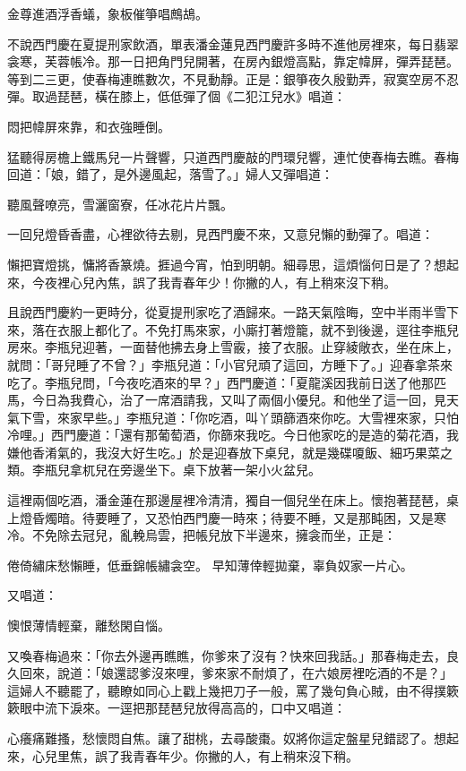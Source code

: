 金尊進酒浮香蟻，象板催箏唱鷓鴣。

不說西門慶在夏提刑家飲酒，單表潘金蓮見西門慶許多時不進他房裡來，每日翡翠衾寒，芙蓉帳冷。那一日把角門兒開著，在房內銀燈高點，靠定幃屏，彈弄琵琶。等到二三更，使春梅連瞧數次，不見動靜。正是：銀箏夜久殷勤弄，寂寞空房不忍彈。取過琵琶，橫在膝上，低低彈了個《二犯江兒水》唱道：

悶把幃屏來靠，和衣強睡倒。

猛聽得房檐上鐵馬兒一片聲響，只道西門慶敲的門環兒響，連忙使春梅去瞧。春梅回道：「娘，錯了，是外邊風起，落雪了。」婦人又彈唱道：

聽風聲嘹亮，雪灑窗寮，任冰花片片飄。

一回兒燈昏香盡，心裡欲待去剔，見西門慶不來，又意兒懶的動彈了。唱道：

懶把寶燈挑，慵將香篆燒。捱過今宵，怕到明朝。細尋思，這煩惱何日是了？想起來，今夜裡心兒內焦，誤了我青春年少！你撇的人，有上稍來沒下稍。

且說西門慶約一更時分，從夏提刑家吃了酒歸來。一路天氣陰晦，空中半雨半雪下來，落在衣服上都化了。不免打馬來家，小廝打著燈籠，就不到後邊，逕往李瓶兒房來。李瓶兒迎著，一面替他拂去身上雪霰，接了衣服。止穿綾敞衣，坐在床上，就問：「哥兒睡了不曾？」李瓶兒道：「小官兒頑了這回，方睡下了。」迎春拿茶來吃了。李瓶兒問，「今夜吃酒來的早？」西門慶道：「夏龍溪因我前日送了他那匹馬，今日為我費心，治了一席酒請我，又叫了兩個小優兒。和他坐了這一回，見天氣下雪，來家早些。」李瓶兒道：「你吃酒，叫丫頭篩酒來你吃。大雪裡來家，只怕冷哩。」西門慶道：「還有那葡萄酒，你篩來我吃。今日他家吃的是造的菊花酒，我嫌他香淆氣的，我沒大好生吃。」於是迎春放下桌兒，就是幾碟嗄飯、細巧果菜之類。李瓶兒拿杌兒在旁邊坐下。桌下放著一架小火盆兒。

這裡兩個吃酒，潘金蓮在那邊屋裡冷清清，獨自一個兒坐在床上。懷抱著琵琶，桌上燈昏燭暗。待要睡了，又恐怕西門慶一時來；待要不睡，又是那盹困，又是寒冷。不免除去冠兒，亂輓烏雲，把帳兒放下半邊來，擁衾而坐，正是：

倦倚繡床愁懶睡，低垂錦帳繡衾空。
早知薄倖輕拋棄，辜負奴家一片心。

又唱道：

懊恨薄情輕棄，離愁閑自惱。

又喚春梅過來：「你去外邊再瞧瞧，你爹來了沒有？快來回我話。」那春梅走去，良久回來，說道：「娘還認爹沒來哩，爹來家不耐煩了，在六娘房裡吃酒的不是？」這婦人不聽罷了，聽瞭如同心上戳上幾把刀子一般，罵了幾句負心賊，由不得撲簌簌眼中流下淚來。一逕把那琵琶兒放得高高的，口中又唱道：

心癢痛難搔，愁懷悶自焦。讓了甜桃，去尋酸棗。奴將你這定盤星兒錯認了。想起來，心兒里焦，誤了我青春年少。你撇的人，有上稍來沒下稍。

